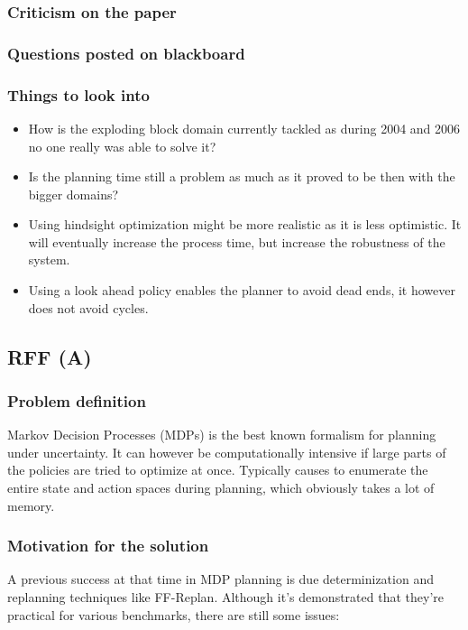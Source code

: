 \documentclass[runningheads,a4paper]{llncs}
\begin{document}
\subsubsection{Criticism on the paper}

\subsubsection{Questions posted on blackboard}

\subsubsection{Things to look into}
\begin{itemize}
	\item How is the exploding block domain currently tackled as during 2004 and 2006 no one really was able to solve it?
	\item Is the planning time still a problem as much as it proved to be then with the bigger domains?
	\item Using hindsight optimization might be more realistic as it is less optimistic. It will eventually increase the process time, but increase the robustness of the system.
	\item Using a look ahead policy enables the planner to avoid dead ends, it however does not avoid cycles.
\end{itemize}

\subsection{RFF (A)}

\subsubsection{Problem definition}

Markov Decision Processes (MDPs) is the best known formalism for planning under
uncertainty. It can however be computationally intensive if large parts of the
policies are tried to optimize at once. Typically causes to enumerate the
entire state and action spaces during planning, which obviously takes a lot of
memory.

\subsubsection{Motivation for the solution}

A previous success at that time in MDP planning is due determinization and
replanning techniques like FF-Replan. Although it's demonstrated that they're
practical for various benchmarks, there are still some issues:
\end{document}
